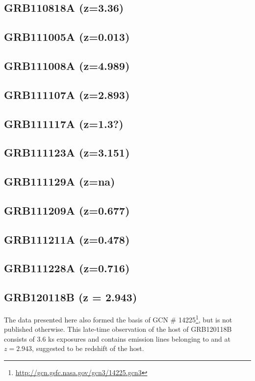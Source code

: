 \documentclass{aa}    %
\begin{document}
\subsection{GRB110818A (z=3.36)}

\subsection{GRB111005A (z=0.013)}

\subsection{GRB111008A  (z=4.989)}

\subsection{GRB111107A (z=2.893)}

\subsection{GRB111117A (z=1.3?)}

\subsection{GRB111123A  (z=3.151)}

\subsection{GRB111129A (z=na)}

\subsection{GRB111209A (z=0.677)}

\subsection{GRB111211A (z=0.478)}

\subsection{GRB111228A (z=0.716)}




\subsection{GRB120118B (z = 2.943)}
The data presented here also formed the basis of GCN \#
14225\footnote{\url{http://gcn.gsfc.nasa.gov/gcn3/14225.gcn3}}, but is not
published otherwise. This late-time observation of the host of GRB120118B
consists of 3.6 ks exposures and contains emission lines belonging to \oii and
\oiii at $z =	2.943$, suggested to be redshift of the host.
\end{document}
